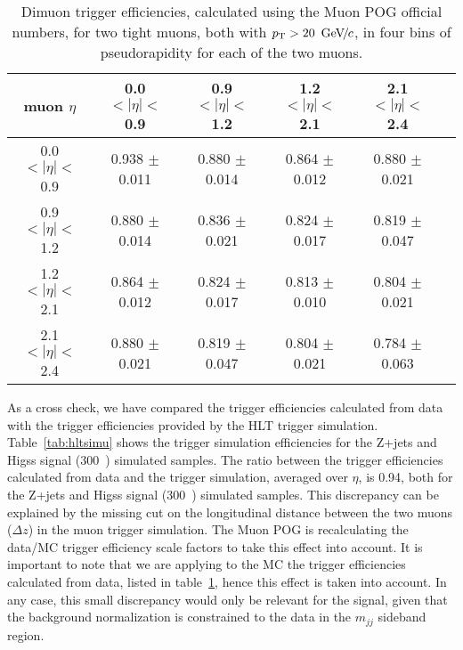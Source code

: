 \begin{table}[h!]
\caption{Dimuon trigger efficiencies, calculated using the Muon POG official numbers, for two tight muons, both with $p_{\mathrm{T}} > 20~{\,\text{Ge\hspace{-.08em}V\hspace{-0.16em}/\hspace{-0.08em}}c}$, in four bins of pseudorapidity for each of the two muons.}
\label{dimuoneff}
\begin{center}
\begin{tabular}{|c|c|c|c|c|c|}
\hline
 muon $\eta$ & 0.0 $< |\eta| < $0.9  & 0.9 $< |\eta| < $ 1.2 &  1.2 $< |\eta| < $ 2.1 & 2.1 $< |\eta| < $ 2.4 \\ \hline
 0.0 $< |\eta| < $ 0.9 & 0.938 $\pm$ 0.011 & 0.880 $\pm$ 0.014 & 0.864 $\pm$ 0.012 & 0.880 $\pm$ 0.021 \\
 0.9 $< |\eta| < $ 1.2 & 0.880 $\pm$ 0.014 & 0.836 $\pm$ 0.021 & 0.824 $\pm$ 0.017 & 0.819 $\pm$ 0.047 \\ 
 1.2 $< |\eta| < $ 2.1 & 0.864 $\pm$ 0.012 & 0.824 $\pm$ 0.017 & 0.813 $\pm$ 0.010 & 0.804 $\pm$ 0.021 \\
 2.1 $< |\eta| < $ 2.4 & 0.880 $\pm$ 0.021 & 0.819 $\pm$ 0.047 & 0.804 $\pm$ 0.021 & 0.784 $\pm$ 0.063 \\ \hline
\end{tabular}
\end{center}
\end{table}

As a cross check, we have compared the trigger efficiencies calculated from data
with the trigger efficiencies provided by the HLT trigger simulation. Table~\ref{tab:hltsimu} shows
the trigger simulation efficiencies for the Z+jets and Higss signal (300~\GeVcc{}) simulated samples.
The ratio between the trigger efficiencies calculated from data and the 
trigger simulation, averaged over $\eta$, is 0.94, both for the
Z+jets and Higss signal (300~\GeVcc{}) simulated samples. This discrepancy can
be explained by the missing cut on the longitudinal distance between the two muons ($\Delta z$)
in the muon trigger simulation. The Muon POG is recalculating the data/MC trigger efficiency scale factors
to take this effect into account. It is important to note that we are applying to the MC the trigger
efficiencies calculated from data, listed in table~\ref{dimuoneff}, hence this effect is taken into account.
In any case, this small discrepancy would only be relevant for the signal,
given that the background normalization is constrained to the data in the $m_{jj}$ sideband region.


